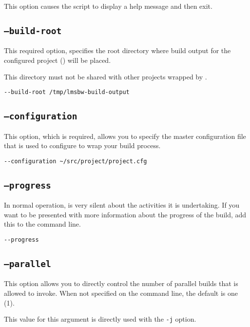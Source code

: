 This option causes the script to display a help message and then exit.

\subsection{\texttt{--build-root}}

This required option, specifies the root directory where build output
for the configured project () will be
placed.

This directory must not be shared with other projects wrapped by
\lmsbw.

\begin{verbatim}
--build-root /tmp/lmsbw-build-output
\end{verbatim}

\subsection{\texttt{--configuration}}\label{lmsbw:configuration}

This option, which is required, allows you to specify the master
configuration file that is used to configure \lmsbw to wrap your build
process.

\begin{verbatim}
--configuration ~/src/project/project.cfg
\end{verbatim}


\subsection{\texttt{--progress}}

In normal operation, \lmsbw is very silent about the activities it is
undertaking.  If you want to be presented with more information about
the progress of the build, add this to the command line.

\begin{verbatim}
--progress
\end{verbatim}

\subsection{\texttt{--parallel}}

This option allows you to directly control the number of parallel
builds that \make is allowed to invoke.  When not specified on the
command line, the default is one (1).

This value for this argument is directly used with the \gnumake
\texttt{-j} option.

